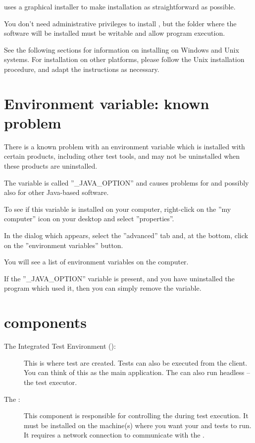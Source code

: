 
\app{} uses a graphical installer to make installation as straightforward as possible. 

You don't need administrative privileges to install \app{}, but the folder where the software will be installed must be writable and allow program execution.

See the following sections for information on installing \app{} on Windows and Unix systems. For installation on  other platforms, please follow the Unix installation procedure, and adapt the instructions as necessary.

\section{Environment variable: known problem}
There is a known problem with an environment variable which is installed with certain products, including other test tools, and may not be uninstalled when these products are uninstalled. 

The variable is called ''\_JAVA\_OPTION'' and causes problems for \app{} and possibly also for other Java-based software.

To see if this variable is installed on your computer, right-click on the ''my computer'' icon on your desktop and select ''properties''. 

In the dialog which appears, select the ''advanced'' tab and, at the bottom, click on the ''environment variables'' button. 

You will see a list of environment variables on the computer. 

If the ''\_JAVA\_OPTION'' variable is present, and you have uninstalled the program which used it, then you can simply remove the variable.


\section{\app{} components}


\begin{description}
\item [The Integrated Test Environment (\ite{}): ]{This is where test are created. Tests can also be executed from the client. You can think of this as the main application. The \ite{} can also run headless -- the test executor.}
\item [The \gdagent{}:]{ This component is responsible for controlling the \gdaut{} during test execution. It must be installed on the machine(s) where you want your \gdaut{} and tests to run. It requires a network connection to communicate with the \ite{}. }
\end{description}


